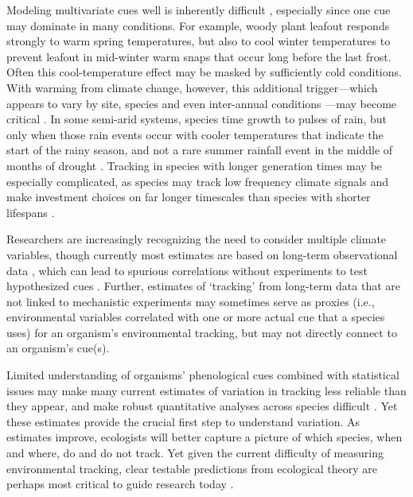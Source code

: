 \documentclass[11pt,letterpaper]{article}
\begin{document}
Modeling multivariate cues well is inherently difficult \citep{chuine2016}, especially since one cue may dominate in many conditions. For example, woody plant leafout responds strongly to warm spring temperatures, but also to cool winter temperatures to prevent leafout in mid-winter warm snaps that occur long before the last frost. Often this cool-temperature effect may be masked by sufficiently cold conditions. With warming from climate change, however, this additional trigger---which appears to vary by site, species and even inter-annual conditions \citep{dennis2003}---may become critical \citep[and potentially lead many phenological models to fail spectacularly in the future as additional cues come into play, see][]{chuine2016}. In some semi-arid systems, species time growth to pulses of rain, but only when those rain events occur with cooler temperatures that indicate the start of the rainy season, and not a rare summer rainfall event in the middle of months of drought \citep{Wainwright:2012tw,wainwright2013}. Tracking in species with longer generation times may be especially complicated, as species may track low frequency climate signals and make investment choices on far longer timescales than species with shorter lifespans \citep{morris2008}. 

Researchers are increasingly recognizing the need to consider multiple climate variables, though currently most estimates are based on long-term observational data \citep[e.g.,][]{chmiel2013,simmonds2019}, which can lead to spurious correlations without experiments to test hypothesized cues \citep{chuinearees}. Further, estimates of `tracking' from long-term data that are not linked to mechanistic experiments may sometimes serve as proxies (i.e., environmental variables correlated with one or more actual cue that a species uses) for an organism's environmental tracking, but may not directly connect to an organism's cue(s). 

Limited understanding of organisms' phenological cues combined with statistical issues may make many current estimates of variation in tracking less reliable than they appear, and make robust quantitative analyses across species difficult \citep{brown2016,kharouba2018}. Yet these estimates provide the crucial first step to understand variation. As estimates improve, ecologists will better capture a picture of which species, when and where, do and do not track. Yet given the current difficulty of measuring environmental tracking, clear testable predictions from ecological theory are perhaps most critical to guide research today \citep{Smaldino2016}. %
\end{document}
